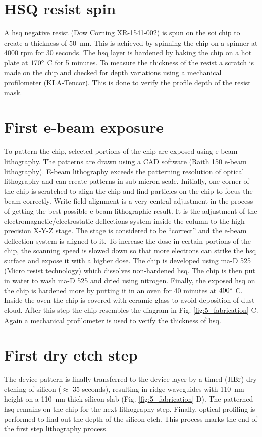 \documentclass[../report.tex]{subfiles}
\begin{document}
\section{HSQ resist spin}
A \gls{hsq} negative resist (Dow Corning XR-1541-002) is spun on the \gls{soi} chip to create a thickness of \SI{50}{\nano \meter}. This is achieved by spinning the chip on a spinner at 4000 rpm for 30 seconds. The \gls{hsq} layer is hardened by baking the chip on a hot plate at $\mathrm{170^{\circ}}$ C for 5 minutes. To measure the thickness of the resist a scratch is made on the chip and checked for depth variations using a mechanical profilometer (KLA-Tencor). This is done to verify the profile depth of the resist mask.

\section{First e-beam exposure}
To pattern the chip, selected portions of the chip are exposed using e-beam lithography. The patterns are drawn using a CAD software (Raith 150 e-beam lithography). E-beam lithography exceeds the patterning resolution of optical lithography and can create patterns in sub-micron scale. Initially, one corner of the chip is scratched to align the chip and find particles on the chip to focus the beam correctly. Write-field alignment is a very central adjustment in the process of getting the best possible e-beam lithographic result. It is the adjustment of the electromagnetic/electrostatic deflections system inside the column to the high precision X-Y-Z stage. The stage is considered to be ``correct'' and the e-beam deflection system is aligned to it. To increase the dose in certain portions of the chip, the scanning speed is slowed down so that more electrons can strike the \gls{hsq} surface and expose it with a higher dose. The chip is developed using ma-D 525 (Micro resist technology) which dissolves non-hardened \gls{hsq}. The chip is then put in water to wash ma-D 525 and dried using nitrogen. Finally, the exposed \gls{hsq} on the chip is hardened more by putting it in an oven for 40 minutes at $\mathrm{400^{\circ}}$ C. Inside the oven the chip is covered with ceramic glass to avoid deposition of dust cloud. After this step the chip resembles the diagram in Fig. \ref{fig:5_fabrication} C. Again a mechanical profilometer is used to verify the thickness of \gls{hsq}.    

\section{First dry etch step}
The device pattern is finally transferred to the device layer by a timed ($\mathrm{HBr}$) dry etching of silicon ($\approx$ 35 seconds), resulting in ridge waveguides with \SI{110}{\nano \meter} height on a \SI{110}{\nano \meter} thick silicon slab (Fig. \ref{fig:5_fabrication} D). The patterned \gls{hsq} remains on the chip for the next lithography step. Finally, optical profiling is performed to find out the depth of the silicon etch. This process marks the end of the first step lithography process.
\end{document}
